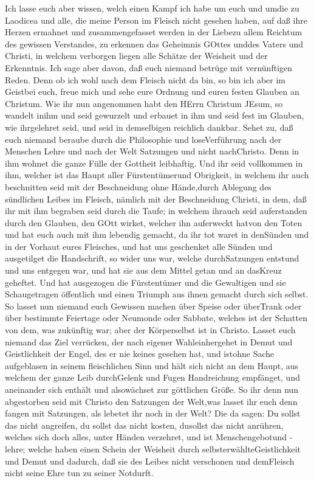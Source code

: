  Ich lasse euch aber wissen, welch einen Kampf ich habe um
euch und umdie zu Laodicea und alle, die meine Person im Fleisch nicht
gesehen haben,  auf daß ihre Herzen ermahnet und
zusammengefasset werden in der Liebezu allem Reichtum des gewissen
Verstandes, zu erkennen das Geheimnis GOttes unddes Vaters und Christi,
 in welchem verborgen liegen alle Schätze der Weisheit und
der Erkenntnis.  Ich sage aber davon, daß euch niemand
betrüge mit vernünftigen Reden.  Denn ob ich wohl nach dem
Fleisch nicht da bin, so bin ich aber im Geistbei euch, freue mich und
sehe eure Ordnung und euren festen Glauben an Christum.  Wie
ihr nun angenommen habt den HErrn Christum JEsum, so wandelt inihm
 und seid gewurzelt und erbauet in ihm und seid fest im
Glauben, wie ihrgelehret seid, und seid in demselbigen reichlich
dankbar.  Sehet zu, daß euch niemand beraube durch die
Philosophie und loseVerführung nach der Menschen Lehre und nach der Welt
Satzungen und nicht nachChristo.  Denn in ihm wohnet die
ganze Fülle der Gottheit leibhaftig.  Und ihr seid
vollkommen in ihm, welcher ist das Haupt aller Fürstentümerund
Obrigkeit,  in welchem ihr auch beschnitten seid mit der
Beschneidung ohne Hände,durch Ablegung des sündlichen Leibes im Fleisch,
nämlich mit der Beschneidung Christi,  in dem, daß ihr mit
ihm begraben seid durch die Taufe; in welchem ihrauch seid auferstanden
durch den Glauben, den GOtt wirket, welcher ihn auferweckt hatvon den
Toten  und hat euch auch mit ihm lebendig gemacht, da ihr
tot waret in denSünden und in der Vorhaut eures Fleisches, und hat uns
geschenket alle Sünden  und ausgetilget die Handschrift, so
wider uns war, welche durchSatzungen entstund und uns entgegen war, und
hat sie aus dem Mittel getan und an dasKreuz geheftet.  Und
hat ausgezogen die Fürstentümer und die Gewaltigen und sie Schaugetragen
öffentlich und einen Triumph aus ihnen gemacht durch sich selbst.
 So lasset nun niemand euch Gewissen machen über Speise
oder überTrank oder über bestimmte Feiertage oder Neumonde oder Sabbate,
 welches ist der Schatten von dem, was zukünftig war; aber
der Körperselbst ist in Christo.  Lasset euch niemand das
Ziel verrücken, der nach eigener Wahleinhergehet in Demut und
Geistlichkeit der Engel, des er nie keines gesehen hat, und istohne
Sache aufgeblasen in seinem fleischlichen Sinn  und hält
sich nicht an dem Haupt, aus welchem der ganze Leib durchGelenk und
Fugen Handreichung empfänget, und aneinander sich enthält und
alsowächset zur göttlichen Größe.  So ihr denn nun
abgestorben seid mit Christo den Satzungen der Welt,was lasset ihr euch
denn fangen mit Satzungen, als lebetet ihr noch in der Welt?
 Die da sagen: Du sollst das nicht angreifen, du sollst das
nicht kosten, dusollst das nicht anrühren,  welches sich
doch alles, unter Händen verzehret, und ist Menschengebotund - lehre;
 welche haben einen Schein der Weisheit durch
selbsterwählteGeistlichkeit und Demut und dadurch, daß sie des Leibes
nicht verschonen und demFleisch nicht seine Ehre tun zu seiner Notdurft.

